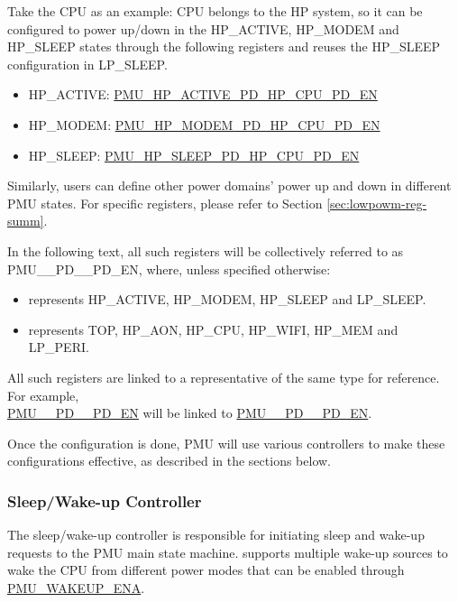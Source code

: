 \documentclass[main\_\_EN.tex]{subfiles}
\begin{document}
Take the CPU as an example: CPU belongs to the HP system, so it can be configured to power up/down in the HP\_ACTIVE, HP\_MODEM and HP\_SLEEP states through the following registers and reuses the HP\_SLEEP configuration in LP\_SLEEP.

\begin{itemize}
    \item HP\_ACTIVE: \hyperref[fielddesc:PMUHPACTIVEPDHPCPUPDEN]{PMU\_HP\_ACTIVE\_PD\_HP\_CPU\_PD\_EN}
    \item HP\_MODEM: \hyperref[fielddesc:PMUHPMODEMPDHPCPUPDEN]{PMU\_HP\_MODEM\_PD\_HP\_CPU\_PD\_EN}
    \item HP\_SLEEP: \hyperref[fielddesc:PMUHPSLEEPPDHPCPUPDEN]{PMU\_HP\_SLEEP\_PD\_HP\_CPU\_PD\_EN}
\end{itemize}

Similarly, users can define other power domains' power up and down in different PMU states. For specific registers, please refer to Section \ref{sec:lowpowm-reg-summ}.

\begin{tiplisting}
In the following text, all such registers will be collectively referred to as PMU\_\_PD\_\_PD\_EN, where, unless specified otherwise:
\begin{itemize}
\item {} represents HP\_ACTIVE, HP\_MODEM, HP\_SLEEP and LP\_SLEEP.
\item {} represents TOP, HP\_AON, HP\_CPU, HP\_WIFI, HP\_MEM and LP\_PERI.
\end{itemize}

All such registers are linked to a representative of the same type for reference. For example, \\
\hyperref[fielddesc:PMUHPACTIVEPDTOPPDEN]{PMU\_\_PD\_\_PD\_EN}
will be linked to
\hyperref[fielddesc:PMUHPACTIVEPDTOPPDEN]{PMU\_\_PD\_\_PD\_EN}.
\end{tiplisting}

Once the configuration is done, PMU will use various controllers to make these configurations effective, as described in the sections below.

\subsubsection{Sleep/Wake-up Controller}

The sleep/wake-up controller is responsible for initiating sleep and wake-up requests to the PMU main state machine. \chipname{} supports multiple wake-up sources to wake the CPU from different power modes that can be enabled through \hyperref[fielddesc:PMUWAKEUPENA]{PMU\_WAKEUP\_ENA}.
\end{document}
